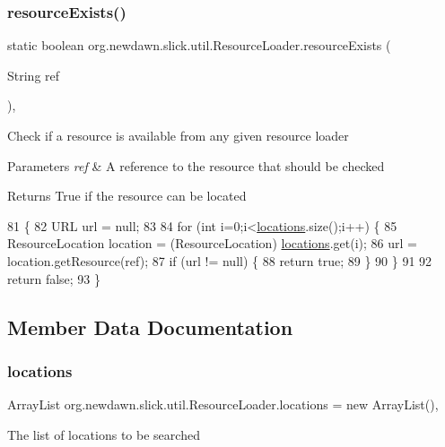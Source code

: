 \subsubsection{\texorpdfstring{resource\+Exists()}{resourceExists()}}
{\footnotesize\ttfamily static boolean org.\+newdawn.\+slick.\+util.\+Resource\+Loader.\+resource\+Exists (\begin{DoxyParamCaption}\item[{String}]{ref }\end{DoxyParamCaption})\hspace{0.3cm}{\ttfamily [inline]}, {\ttfamily [static]}}

Check if a resource is available from any given resource loader


\begin{DoxyParams}{Parameters}
{\em ref} & A reference to the resource that should be checked \\
\hline
\end{DoxyParams}
\begin{DoxyReturn}{Returns}
True if the resource can be located 
\end{DoxyReturn}

\begin{DoxyCode}
81                                                      \{
82         URL url = null;
83         
84         \textcolor{keywordflow}{for} (\textcolor{keywordtype}{int} i=0;i<\mbox{\hyperlink{classorg_1_1newdawn_1_1slick_1_1util_1_1_resource_loader_a28036dde216244ec1fb50577d136eac3}{locations}}.size();i++) \{
85             ResourceLocation location = (ResourceLocation) \mbox{\hyperlink{classorg_1_1newdawn_1_1slick_1_1util_1_1_resource_loader_a28036dde216244ec1fb50577d136eac3}{locations}}.get(i);
86             url = location.getResource(ref);
87             \textcolor{keywordflow}{if} (url != null) \{
88                 \textcolor{keywordflow}{return} \textcolor{keyword}{true};
89             \}
90         \}
91         
92         \textcolor{keywordflow}{return} \textcolor{keyword}{false};
93     \}
\end{DoxyCode}


\subsection{Member Data Documentation}
\mbox{\label{classorg_1_1newdawn_1_1slick_1_1util_1_1_resource_loader_a28036dde216244ec1fb50577d136eac3}} 
\subsubsection{\texorpdfstring{locations}{locations}}
{\footnotesize\ttfamily Array\+List org.\+newdawn.\+slick.\+util.\+Resource\+Loader.\+locations = new Array\+List()\hspace{0.3cm}{\ttfamily [static]}, {\ttfamily [private]}}

The list of locations to be searched 